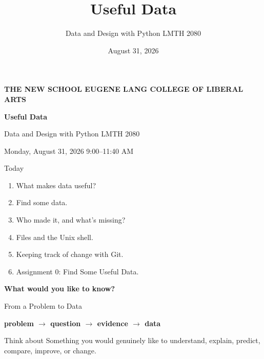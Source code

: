 \documentclass[aspectratio=169]{beamer}
\title{Useful Data}
\subtitle{Data and Design with Python \textbullet{} LMTH 2080}
\author{}
\date{August 31, 2026}
\newcommand{\redrule}{\par\vspace{0.15cm}{\color{LangRed}\rule{\linewidth}{1.5pt}}}
\newcommand{\bigquestion}[1]{\begin{center}\vfill{\fontsize{30}{35}\selectfont\bfseries #1}\vfill\end{center}}
\begin{document}
\begin{frame}[plain]
  {\color{LangRed}\bfseries THE NEW SCHOOL \textbullet{} EUGENE LANG COLLEGE OF LIBERAL ARTS}\par
  \vspace{0.55cm}
  {\fontsize{34}{39}\selectfont\bfseries Useful Data}\par
  \vspace{0.15cm}
  {\Large Data and Design with Python \textbullet{} LMTH 2080}\par
  \redrule
  \vfill
  {\large Monday, August 31, 2026 \textbullet{} 9:00--11:40 AM}
\end{frame}

\begin{frame}{Today}
\redrule
\vspace{0.25cm}
\begin{enumerate}
  \setlength\itemsep{0.25cm}
  \item What makes data useful?
  \item Find some data.
  \item Who made it, and what's missing?
  \item Files and the Unix shell.
  \item Keeping track of change with Git.
  \item Assignment 0: Find Some Useful Data.
\end{enumerate}
\end{frame}

\begin{frame}[plain]
\bigquestion{What would you like to know?}
\end{frame}

\begin{frame}{From a Problem to Data}
\redrule
\vfill
\begin{center}
{\LARGE\bfseries
problem $\longrightarrow$ question $\longrightarrow$ evidence $\longrightarrow$ data}
\end{center}
\vfill
\begin{block}{Think about}
Something you would genuinely like to understand, explain, predict, compare, improve, or change.
\end{block}
\end{frame}
\end{document}
